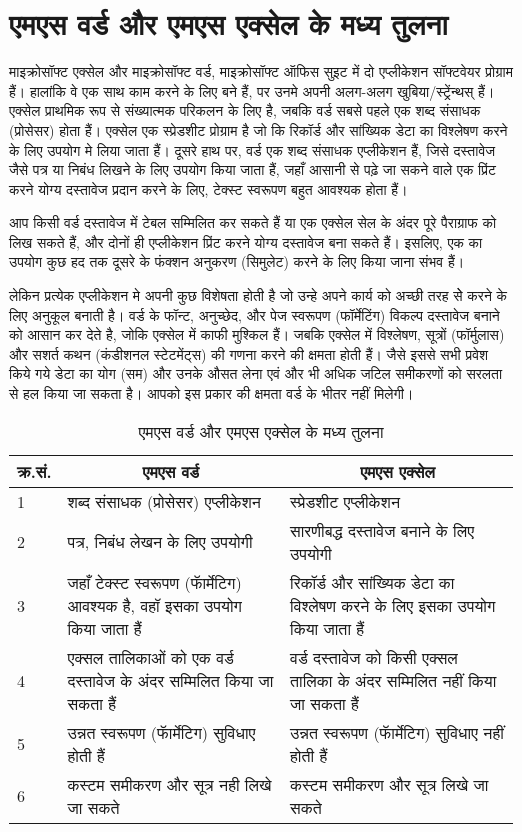 \section{एमएस वर्ड और एमएस एक्सेल के मध्य तुलना}\label{id-1.1}

माइक्रोसॉफ्ट एक्सेल और माइक्रोसॉफ्ट वर्ड, माइक्रोसॉफ्ट ऑफिस सुइट में दो एप्लीकेशन सॉफ्टवेयर प्रोग्राम हैं। हालांकि वे एक साथ काम करने के लिए बने हैं, पर उनमे अपनी अलग-अलग खुबिया/स्ट्रेंन्थस् हैं। एक्सेल प्राथमिक रूप से संख्यात्मक परिकलन के लिए है, जबकि वर्ड सबसे पहले एक शब्द संसाधक (प्रोसेसर) होता हैं। एक्सेल एक स्प्रेडशीट प्रोग्राम है जो कि रिकॉर्ड और सांख्यिक डेटा का विश्लेषण करने के लिए उपयोग मे लिया जाता हैं। दूसरे हाथ पर, वर्ड एक शब्द संसाधक एप्लीकेशन हैं, जिसे दस्तावेज जैसे पत्र या निबंध लिखने के लिए उपयोग किया जाता हैं, जहाँ आसानी से पढ़े जा सकने वाले एक प्रिंट करने योग्य दस्तावेज प्रदान करने के लिए, टेक्स्ट स्वरूपण बहुत आवश्यक होता हैं।

आप किसी वर्ड दस्तावेज में टेबल सम्मिलित कर सकते हैं या एक एक्सेल सेल के अंदर पूरे पैराग्राफ को लिख सकते हैं, और दोनों ही एप्लीकेशन प्रिंट करने योग्य दस्तावेज बना सकते हैं। इसलिए, एक का उपयोग कुछ हद तक दूसरे के फंक्शन अनुकरण (सिमुलेट) करने के लिए किया जाना संभव हैं।

लेकिन प्रत्येक एप्लीकेशन मे अपनी कुछ विशेषता होती है जो उन्हे अपने कार्य को अच्छी तरह सेे करने के लिए अनुकूल बनाती है। वर्ड के फॉन्ट, अनुच्छेद, और पेज स्वरूपण (फॉर्मेटिंग) विकल्प दस्तावेज बनाने को आसान कर देते है, जोकि एक्सेल में काफी मुश्किल हैं। जबकि एक्सेल में विश्लेषण, सूत्रों (फॉर्मुलास) और सशर्त कथन (कंडीशनल स्टेटमेंट्स) की गणना करने की क्षमता होती हैं। जैसे इससे सभी प्रवेश किये गये डेटा का योग (सम) और उनके औसत लेना एवं और भी अधिक जटिल समीकरणों को सरलता से हल किया जा सकता है। आपको इस प्रकार की क्षमता वर्ड के भीतर नहीं मिलेगी।

\begin{table}[h]
\centering
\caption{एमएस वर्ड और एमएस एक्सेल के मध्य तुलना}
\begin{tabular}{@{}|l|p{6cm}|p{6cm}@{}|}
\hline
\multicolumn{1}{|c}{\textbf{क्र.सं.}} & \multicolumn{1}{|c|}{\textbf{एमएस वर्ड}} & \multicolumn{1}{c|}{\textbf{एमएस एक्सेल}} \\
\hline
1 & शब्द संसाधक (प्रोसेसर) एप्लीकेशन & स्प्रेडशीट एप्लीकेशन \\
\hline
2 & पत्र, निबंध लेखन के लिए उपयोगी & सारणीबद्ध दस्तावेज बनाने के लिए उपयोगी \\
\hline
3 & जहाँ टेक्स्ट स्वरूपण (फॅार्मेटिग) आवश्यक है, वहॉ इसका उपयोग किया जाता हैं & रिकॉर्ड और सांख्यिक डेटा का विश्लेषण करने के लिए इसका उपयोग किया जाता हैं \\
\hline
4 & एक्सल तालिकाओं को एक वर्ड दस्तावेज के अंदर सम्मिलित किया जा सकता हैं & वर्ड दस्तावेज को किसी एक्सल तालिका के अंदर सम्मिलित नहीं किया जा सकता हैं \\
\hline
5 & उन्नत स्वरूपण (फॅार्मेटिग) सुविधाए होती हैं & उन्नत स्वरूपण (फॅार्मेटिग) सुविधाए नहीं होती हैं \\
\hline
6 & कस्टम समीकरण और सूत्र नही लिखे जा सकते & कस्टम समीकरण और सूत्र लिखे जा सकते \\
\hline
\end{tabular}
\end{table}


